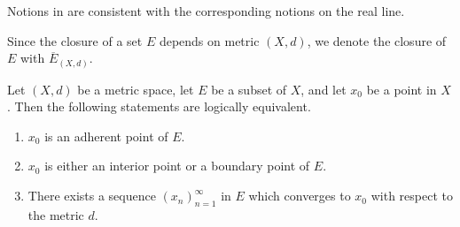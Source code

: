 \begin{note}
  Notions in  are consistent with the corresponding notions on the real line.
\end{note}

\begin{note}
  Since the closure of a set \(E\) depends on metric \((X, d)\), we denote the closure of \(E\) with \(\overline{E}_{(X, d)}\).
\end{note}

\begin{prop}\label{ii:1.2.10}
  Let \((X, d)\) be a metric space, let \(E\) be a subset of \(X\), and let \(x_0\) be a point in \(X\).
  Then the following statements are logically equivalent.
  \begin{enumerate}
    \item\label{ii:1.2.10.a} \(x_0\) is an adherent point of \(E\).
    \item\label{ii:1.2.10.b} \(x_0\) is either an interior point or a boundary point of \(E\).
    \item\label{ii:1.2.10.c} There exists a sequence \((x_n)_{n = 1}^\infty\) in \(E\) which converges to \(x_0\) with respect to the metric \(d\).
  \end{enumerate}
\end{prop}

